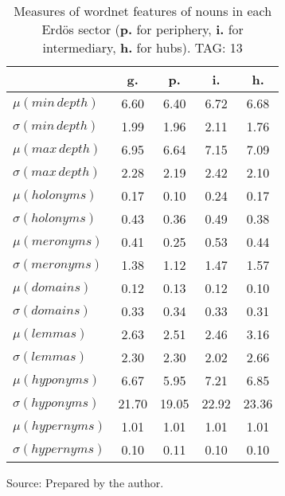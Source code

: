 \begin{table}[h!]
\begin{center}
	\caption{Measures of wordnet features of nouns in each Erd\"os sector ({{\bf p.}} for periphery, {{\bf i.}} for intermediary, {{\bf h.}} for hubs). TAG: 13}\label{tab:wnn}
\begin{tabular}{| l || c | c | c | c |}\hline
 & {\bf g.} & {\bf p.} & {\bf i.} & {\bf h.} \\\hline\hline
$\mu(min\,depth)$ & 6.60  & 6.40  & 6.72  & 6.68 \\
$\sigma(min\,depth)$ & 1.99  & 1.96  & 2.11  & 1.76 \\\hline
$\mu(max\,depth)$ & 6.95  & 6.64  & 7.15  & 7.09 \\
$\sigma(max\,depth)$ & 2.28  & 2.19  & 2.42  & 2.10 \\\hline
$\mu(holonyms)$ & 0.17  & 0.10  & 0.24  & 0.17 \\
$\sigma(holonyms)$ & 0.43  & 0.36  & 0.49  & 0.38 \\\hline
$\mu(meronyms)$ & 0.41  & 0.25  & 0.53  & 0.44 \\
$\sigma(meronyms)$ & 1.38  & 1.12  & 1.47  & 1.57 \\\hline
$\mu(domains)$ & 0.12  & 0.13  & 0.12  & 0.10 \\
$\sigma(domains)$ & 0.33  & 0.34  & 0.33  & 0.31 \\\hline
$\mu(lemmas)$ & 2.63  & 2.51  & 2.46  & 3.16 \\
$\sigma(lemmas)$ & 2.30  & 2.30  & 2.02  & 2.66 \\\hline
$\mu(hyponyms)$ & 6.67  & 5.95  & 7.21  & 6.85 \\
$\sigma(hyponyms)$ & 21.70  & 19.05  & 22.92  & 23.36 \\\hline
$\mu(hypernyms)$ & 1.01  & 1.01  & 1.01  & 1.01 \\
$\sigma(hypernyms)$ & 0.10  & 0.11  & 0.10  & 0.10 \\\hline
\end{tabular}
\begin{flushleft}
		Source: Prepared by the author.\
\end{flushleft}
\end{center}
\end{table}
